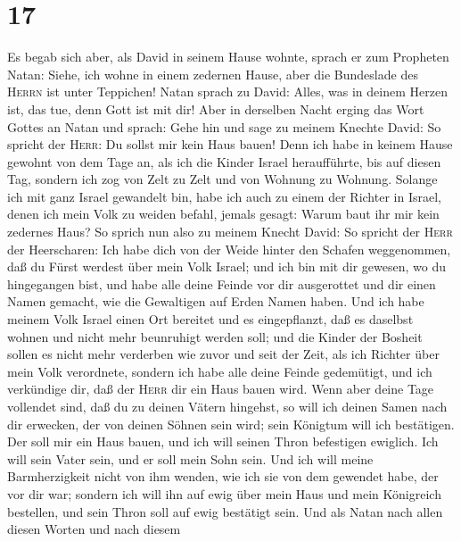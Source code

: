 \hypertarget{section-16}{%
\section{17}\label{section-16}}

 Es begab sich aber, als David in seinem Hause wohnte,
sprach er zum Propheten Natan: Siehe, ich wohne in einem zedernen Hause,
aber die Bundeslade des \textsc{Herrn} ist unter Teppichen! Natan sprach
zu David:  Alles, was in deinem Herzen ist, das tue, denn
Gott ist mit dir!  Aber in derselben Nacht erging das Wort
Gottes an Natan und sprach:  Gehe hin und sage zu meinem
Knechte David: So spricht der \textsc{Herr}: Du sollst mir kein Haus
bauen!  Denn ich habe in keinem Hause gewohnt von dem Tage
an, als ich die Kinder Israel heraufführte, bis auf diesen Tag, sondern
ich zog von Zelt zu Zelt und von Wohnung zu Wohnung. 
Solange ich mit ganz Israel gewandelt bin, habe ich auch zu einem der
Richter in Israel, denen ich mein Volk zu weiden befahl, jemals gesagt:
Warum baut ihr mir kein zedernes Haus?  So sprich nun also
zu meinem Knecht David: So spricht der \textsc{Herr} der Heerscharen:
Ich habe dich von der Weide hinter den Schafen weggenommen, daß du Fürst
werdest über mein Volk Israel;  und ich bin mit dir
gewesen, wo du hingegangen bist, und habe alle deine Feinde vor dir
ausgerottet und dir einen Namen gemacht, wie die Gewaltigen auf Erden
Namen haben.  Und ich habe meinem Volk Israel einen Ort
bereitet und es eingepflanzt, daß es daselbst wohnen und nicht mehr
beunruhigt werden soll; und die Kinder der Bosheit sollen es nicht mehr
verderben wie zuvor und seit der Zeit, als ich Richter über mein Volk
verordnete,  sondern ich habe alle deine Feinde
gedemütigt, und ich verkündige dir, daß der \textsc{Herr} dir ein Haus
bauen wird.  Wenn aber deine Tage vollendet sind, daß du
zu deinen Vätern hingehst, so will ich deinen Samen nach dir erwecken,
der von deinen Söhnen sein wird; sein Königtum will ich bestätigen.
 Der soll mir ein Haus bauen, und ich will seinen Thron
befestigen ewiglich.  Ich will sein Vater sein, und er
soll mein Sohn sein. Und ich will meine Barmherzigkeit nicht von ihm
wenden, wie ich sie von dem gewendet habe, der vor dir war;
 sondern ich will ihn auf ewig über mein Haus und mein
Königreich bestellen, und sein Thron soll auf ewig bestätigt sein.
 Und als Natan nach allen diesen Worten und nach diesem
